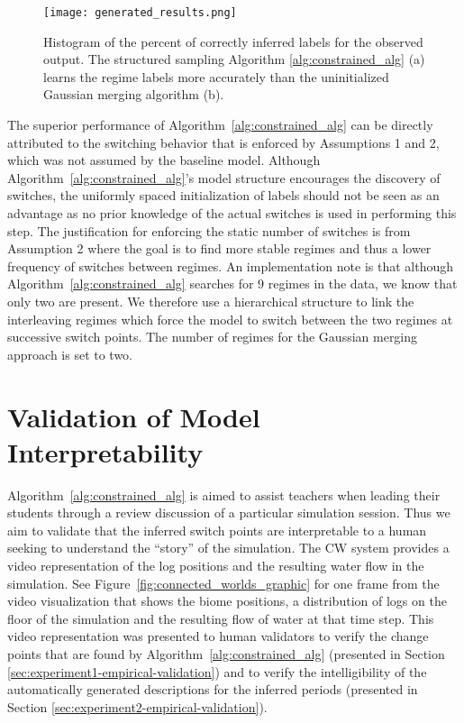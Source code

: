 \begin{figure}
\centering
\texttt{[image: generated\_results.png]}
\caption{Histogram of the percent of correctly inferred labels for the observed output. The structured sampling Algorithm \ref{alg:constrained_alg} (a) learns the regime labels more accurately than the uninitialized Gaussian merging algorithm (b).}
\label{fig:result_generated_histograms}
\end{figure}

The superior performance of Algorithm~\ref{alg:constrained_alg} can be directly attributed to the switching behavior that is enforced by Assumptions 1 and 2, which was not assumed by the baseline model. Although Algorithm~\ref{alg:constrained_alg}'s model structure encourages the discovery of switches, the uniformly spaced initialization of labels should not be seen as an advantage as no prior knowledge of the actual switches is used in performing this step. The justification for enforcing the static number of switches is from Assumption 2 where the goal is to find more stable regimes and thus a lower frequency of switches between regimes. An implementation note is that although Algorithm~\ref{alg:constrained_alg} searches for $9$ regimes in the data, we know that only two are present. We therefore use a hierarchical structure to link the interleaving regimes which force the model to switch between the two regimes at successive switch points. The number of regimes for the Gaussian merging approach is set to two.

\section{Validation of Model Interpretability}

Algorithm~\ref{alg:constrained_alg} is aimed to assist teachers when leading their students through a review discussion of a particular simulation session. Thus we aim to validate that the inferred switch points are interpretable to a human seeking to understand the ``story'' of the simulation. The CW system provides a video representation of the log positions and the resulting water flow in the simulation. See Figure~\ref{fig:connected_worlds_graphic} for one frame from the video visualization that shows the biome positions, a distribution of logs on the floor of the simulation and the resulting flow of water at that time step. This video representation was presented to human validators to verify the change points that are found by Algorithm~\ref{alg:constrained_alg} (presented in Section \ref{sec:experiment1-empirical-validation}) and to verify the intelligibility of the automatically generated descriptions for the inferred periods (presented in Section \ref{sec:experiment2-empirical-validation}).

